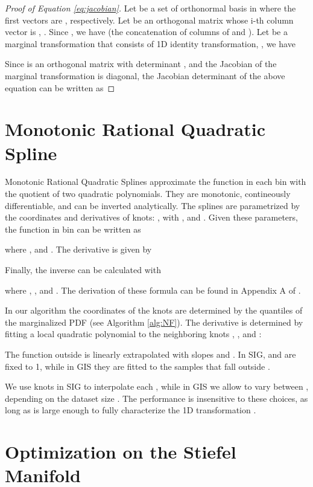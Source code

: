 \documentclass{article}
\begin{document}
\begin{proof}[Proof of Equation \ref{eq:jacobian}]
Let  be a set of orthonormal basis in  where the first  vectors are , respectively. Let  be an orthogonal matrix whose i-th column vector is , . Since , we have  (the concatenation of columns of  and ). Let  be a marginal transformation that consists of  1D identity transformation,  , we have


Since  is an orthogonal matrix with determinant , and the Jacobian of the marginal transformation  is diagonal, the Jacobian determinant of the above equation can be written as

\end{proof}


\section{Monotonic Rational Quadratic Spline}
\label{sec:RQspline}

Monotonic Rational Quadratic Splines \citep{gregory1982piecewise, durkan2019neural} approximate the function in each bin with the quotient of two quadratic polynomials. They are monotonic, contineously differentiable, and can be inverted analytically. The splines are parametrized by the coordinates and derivatives of  knots: , with ,  and . Given these parameters, the function in bin  can be written as \citep{durkan2019neural}

where ,  and . The derivative is given by

Finally, the inverse can be calculated with

where , ,  and . The derivation of these formula can be found in Appendix A of \citet{durkan2019neural}.

In our algorithm the coordinates of the knots are determined by the quantiles of the marginalized PDF (see Algorithm \ref{alg:NF}). The derivative   is determined by fitting a local quadratic polynomial to the neighboring knots , , and :

The function outside  is linearly extrapolated with slopes  and . In SIG,  and  are fixed to 1, while in GIS they are fitted to the samples that fall outside .

We use  knots in SIG to interpolate each , while in GIS we allow  to vary between , depending on the dataset size . The performance is insensitive to these choices, as long as  is large enough to fully characterize the 1D transformation .

\section{Optimization on the Stiefel Manifold}
\label{sec:stiefel}
\end{document}
